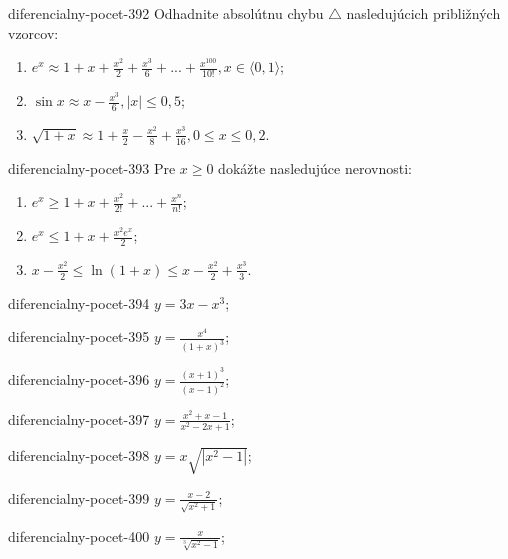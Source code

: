 \begin{defproblem}{diferencialny-pocet-392}
Odhadnite absolútnu chybu $\bigtriangleup$ nasledujúcich približných vzorcov:
\begin{enumerate}
\item $e^x\approx 1+x+\frac{x^2}{2}+\frac{x^3}{6}+...+\frac{x^{100}}{10!},x\in \langle 0,1 \rangle$;
\item $\sin x\approx x-\frac{x^3}{6},|x|\leq 0,5$;
\item $\sqrt{1+x}\approx 1+\frac{x}{2}-\frac{x^2}{8}+\frac{x^3}{16},0\leq x\leq 0,2$.
\end{enumerate}
\end{defproblem}

\begin{defproblem}{diferencialny-pocet-393}
Pre $x\geq 0$ dokážte nasledujúce nerovnosti:
\begin{enumerate}
\item $e^x\geq 1+x+\frac{x^2}{2!}+...+\frac{x^n}{n!}$;
\item $e^x\leq 1+x+\frac{x^2e^x}{2}$;
\item $x-\frac{x^2}{2}\leq \ln (1+x)\leq x-\frac{x^2}{2}+\frac{x^3}{3}$.
\end{enumerate}
\end{defproblem}

\begin{defproblem}{diferencialny-pocet-394}
$y=3x-x^3$;
\end{defproblem}

\begin{defproblem}{diferencialny-pocet-395}
$y=\frac{x^4}{(1+x)^3}$;
\end{defproblem}

\begin{defproblem}{diferencialny-pocet-396}
$y=\frac{(x+1)^3}{(x-1)^2}$;
\end{defproblem}

\begin{defproblem}{diferencialny-pocet-397}
$y=\frac{x^2+x-1}{x^2-2x+1}$;
\end{defproblem}

\begin{defproblem}{diferencialny-pocet-398}
$y=x\sqrt{|x^2-1|}$;
\end{defproblem}

\begin{defproblem}{diferencialny-pocet-399}
$y=\frac{x-2}{\sqrt{x^2+1}}$;
\end{defproblem}

\begin{defproblem}{diferencialny-pocet-400}
$y=\frac{x}{\sqrt[3]{x^2-1}}$;
\end{defproblem}

